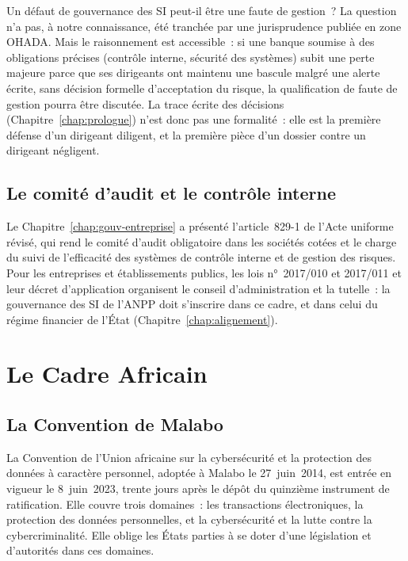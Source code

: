 \begin{boiteRemarque}{Un défaut de gouvernance des SI peut-il être une faute de gestion~?}
La question n'a pas, à notre connaissance, été tranchée par une
jurisprudence publiée en zone OHADA. Mais le raisonnement est
accessible~: si une banque soumise à des obligations précises (contrôle
interne, sécurité des systèmes) subit une perte majeure parce que ses
dirigeants ont maintenu une bascule malgré une alerte écrite, sans
décision formelle d'acceptation du risque, la qualification de faute de
gestion pourra être discutée. La trace écrite des décisions
(Chapitre~\ref{chap:prologue}) n'est donc pas une formalité~: elle est la
première défense d'un dirigeant diligent, et la première pièce d'un
dossier contre un dirigeant négligent.
\end{boiteRemarque}

\subsection{Le comité d'audit et le contrôle interne}

Le Chapitre~\ref{chap:gouv-entreprise} a présenté l'article~829-1 de l'Acte
uniforme révisé, qui rend le comité d'audit obligatoire dans les sociétés
cotées et le charge du suivi de l'efficacité des systèmes de contrôle
interne et de gestion des risques. Pour les entreprises et
établissements publics, les lois n°~2017/010 et 2017/011 et leur décret
d'application organisent le conseil d'administration et la tutelle~: la
gouvernance des SI de l'ANPP doit s'inscrire dans ce cadre, et dans celui
du régime financier de l'État (Chapitre~\ref{chap:alignement}).

\section{Le Cadre Africain}
\label{sec:c10-afrique}

\subsection{La Convention de Malabo}

La Convention de l'Union africaine sur la cybersécurité et la protection
des données à caractère personnel, adoptée à Malabo le 27~juin~2014, est
entrée en vigueur le 8~juin~2023, trente jours après le dépôt du
quinzième instrument de ratification. Elle couvre trois domaines~: les
transactions électroniques, la protection des données personnelles, et
la cybersécurité et la lutte contre la cybercriminalité. Elle oblige les
États parties à se doter d'une législation et d'autorités dans ces
domaines.

